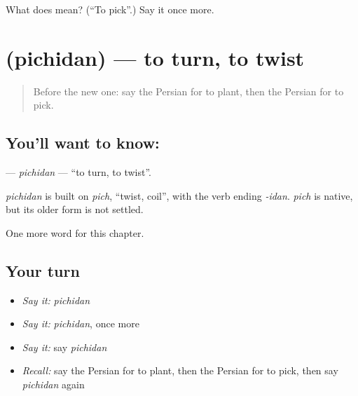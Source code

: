 \begin{tcolorbox}[breakable,colback=teal!4,colframe=teal!35!black,title={Before you move on}]
What does  mean? (\textquotedblleft{}To pick\textquotedblright{}.) Say it once more.
\end{tcolorbox}
\section[\texorpdfstring{\fa{پیچیدن} (pichidan)}{پیچیدن (pichidan)}]{ (pichidan) — to turn, to twist}

\label{lesson:FA-C133-pichidan}



\begin{quote}
Before the new one: say the Persian for to plant, then the Persian for to pick.
\end{quote}

\subsection*{You'll want to know: }
\textbf{} — \emph{pichidan} — \textquotedblleft{}to turn, to twist\textquotedblright{}.

\begin{cousinweb}
\emph{pichidan} is built on \emph{pich}, \textquotedblleft{}twist, coil\textquotedblright{}, with the verb ending \emph{-idan}. \emph{pich} is native, but its older form is not settled.
\end{cousinweb}

\begin{grammarlens}[title={What you've built}]
One more word for this chapter.
\end{grammarlens}

\subsection*{Your turn}
\begin{itemize}
\raggedright
  \item \emph{Say it:} \emph{pichidan}
  \item \emph{Say it:} \emph{pichidan}, once more
  \item \emph{Say it:} say \emph{pichidan}
  \item \emph{Recall:} say the Persian for to plant, then the Persian for to pick, then say \emph{pichidan} again
\end{itemize}

